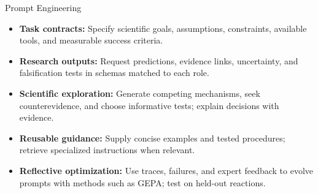 \begin{frame}[t,label=md-49]{Prompt Engineering}
\small
\begin{itemize}
\setlength{\itemsep}{0.65em}
    \item \textbf{Task contracts:} Specify scientific goals, assumptions,
    constraints, available tools, and measurable success criteria.
    \item \textbf{Research outputs:} Request predictions, evidence links,
    uncertainty, and falsification tests in schemas matched to each role.
    \item \textbf{Scientific exploration:} Generate competing mechanisms, seek
    counterevidence, and choose informative tests; explain decisions with evidence.
    \item \textbf{Reusable guidance:} Supply concise examples and tested
    procedures; retrieve specialized instructions when relevant.
    \item \textbf{Reflective optimization:} Use traces, failures, and expert
    feedback to evolve prompts with methods such as GEPA; test on held-out reactions.
\end{itemize}
\end{frame}

